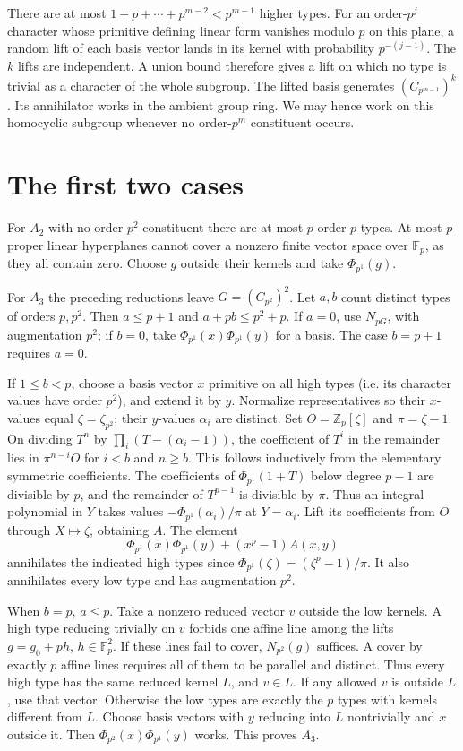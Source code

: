 \documentclass[11pt]{article}
\newcommand{\Z}{\mathbb Z}
\newcommand{\F}{\mathbb F}
\newcommand{\Ph}[1]{\Phi_{p^{#1}}}
\begin{document}
There are at most $1+p+\cdots+p^{m-2}<p^{m-1}$ higher types.
For an order-$p^j$ character whose primitive defining linear form
vanishes modulo $p$ on this plane, a random lift of each basis vector
lands in its kernel with probability $p^{-(j-1)}$. The $k$ lifts are
independent. A union bound therefore gives a lift on which no type is
trivial as a character of the whole subgroup. The lifted basis
generates $(C_{p^{m-1}})^k$. Its annihilator works in the ambient group
ring. We may hence work on this homocyclic subgroup whenever no
order-$p^m$ constituent occurs.

\section{The first two cases}
For $A_2$ with no order-$p^2$ constituent there are at most $p$
order-$p$ types. At most $p$ proper linear hyperplanes cannot cover
a nonzero finite vector space over $\F_p$, as they all contain zero.
Choose $g$ outside their kernels and take $\Ph{1}(g)$.

For $A_3$ the preceding reductions leave $G=(C_{p^2})^2$.
Let $a,b$ count distinct types of orders $p,p^2$. Then
$a\le p+1$ and $a+pb\le p^2+p$. If $a=0$, use $N_{pG}$,
with augmentation $p^2$; if $b=0$, take $\Ph{1}(x)\Ph{1}(y)$
for a basis. The case $b=p+1$ requires $a=0$.

If $1\le b<p$, choose a basis vector $x$ primitive on all high types
(i.e. its character values have order $p^2$), and extend it by $y$.
Normalize representatives so their $x$-values equal
$\zeta=\zeta_{p^2}$; their $y$-values $\alpha_i$ are distinct.
Set $O=\Z_p[\zeta]$ and $\pi=\zeta-1$. On dividing $T^n$ by
$\prod_i(T-(\alpha_i-1))$, the coefficient of $T^i$ in the remainder
lies in $\pi^{n-i}O$ for $i<b$ and $n\ge b$. This follows inductively
from the elementary symmetric coefficients. The coefficients of
$\Ph{1}(1+T)$ below degree $p-1$ are divisible by $p$, and the
remainder of $T^{p-1}$ is divisible by $\pi$. Thus an integral
polynomial in $Y$ takes values $-\Ph{1}(\alpha_i)/\pi$ at $Y=\alpha_i$.
Lift its coefficients from $O$ through $X\mapsto\zeta$, obtaining $A$.
The element
\[
 \Ph{1}(x)\Ph{1}(y)+(x^p-1)A(x,y)
\]
annihilates the indicated high types since $\Ph{1}(\zeta)=(\zeta^p-1)/\pi$.
It also annihilates every low type and has augmentation $p^2$.

When $b=p$, $a\le p$. Take a nonzero reduced vector $v$ outside the
low kernels. A high type reducing trivially on $v$ forbids one affine
line among the lifts $g=g_0+ph$, $h\in\F_p^2$. If these lines fail to
cover, $N_{p^2}(g)$ suffices. A cover by exactly $p$ affine lines
requires all of them to be parallel and distinct. Thus every high
type has the same reduced kernel $L$, and $v\in L$. If any allowed
$v$ is outside $L$, use that vector. Otherwise the low types are exactly
the $p$ types with kernels different from $L$. Choose basis vectors with
$y$ reducing into $L$ nontrivially and $x$ outside it. Then
$\Ph{2}(x)\Ph{1}(y)$ works. This proves $A_3$.
\end{document}
